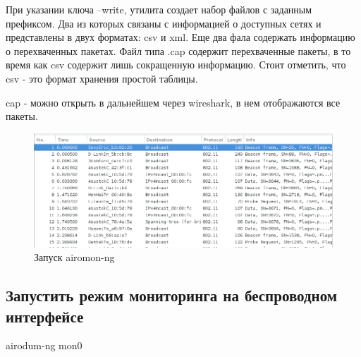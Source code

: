 \documentclass[11pt, a4paper]{article}		%
\begin{document}
При указании ключа --write, утилита создает набор файлов с заданным префиксом. Два из которых связаны с информацией о доступных сетях и представлены в двух форматах: csv и xml. Еще два фала содержать информацию о перехваченных пакетах. Файл типа .cap содержит перехваченные пакеты, в то время как csv содержит лишь сокращенную информацию. Стоит отметить, что csv - это формат хранения простой таблицы.

cap - можно открыть в дальнейшем через wireshark, в нем отображаются все пакеты.

\begin{figure}[h!]
	\centering
	\includegraphics[scale=0.80]{res/cap}
	\caption{Запуск airomon-ng}
\end{figure}




\subsection{Запустить режим мониторинга на беспроводном интерфейсе}

airodum-ng mon0
\end{document}
